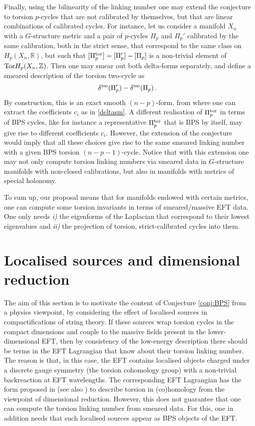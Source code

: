 \documentclass[11pt]{article}
\def\be{\begin{equation}}
\def\ee{\end{equation}}
\newcommand{\IR}{\mathbb{R}}
\newcommand{\IZ}{\mathbb{Z}}
\begin{document}
Finally, using the bilinearity of the linking number one may extend the conjecture to torsion $p$-cycles that are not calibrated by themselves, but that are linear combinations of calibrated cycles. For instance, let us consider a manifold $X_n$ with a $G$-structure metric and a pair of $p$-cycles $\Pi_p$ and $\Pi_p'$ calibrated by the same calibration, both in the strict sense, that correspond to the same class on $H_p(X_n, \IR)$, but such that $[\Pi_p^{\rm tor}] = [\Pi_p'] - [\Pi_p]$ is a non-trivial element of ${\rm Tor} H_p(X_n, \IZ)$. Then one may smear out both delta-forms separately, and define a smeared description of the torsion two-cycle as
\be
\delta^{\rm sm} (\Pi_p') - \delta^{\rm sm} (\Pi_p) \, .
\label{deldif}
\ee
By construction, this is an exact smooth $(n-p)$-form, from where one can extract the coefficients $c_i$ as in \eqref{deltasm}. A different realisation of $\Pi_p^{\rm tor}$ in terms of BPS cycles, like for instance a representative $\Pi_p^{\rm tor}$ that is BPS by itself, may give rise to different coefficients $c_i$. However, the extension of the conjecture would imply that all these choices give rise to the same smeared linking number with a given BPS torsion $(n-p-1)$-cycle. Notice that with this extension one may not only compute torsion linking numbers via smeared data in $G$-structure manifolds with non-closed calibrations, but also in manifolds with metrics of special holonomy. 

To sum up, our proposal means that for manifolds endowed with certain metrics, one can compute some torsion invariants in terms of smeared/massive EFT data. One only needs {\it i)} the eigenforms of the Laplacian that correspond to their lowest eigenvalues and {\it ii)} the projection of torsion, strict-calibrated cycles into them. 



\section{Localised sources and dimensional reduction}
\label{s:dimred}

The aim of this section is to motivate the content of Conjecture \ref{conj:BPS} from a physics viewpoint, by considering the effect of localised sources in compactifications of string theory. If these sources wrap torsion cycles in the compact dimensions and couple to the massive fields present in the lower-dimensional EFT, then by consistency of the low-energy description there should be terms in the EFT Lagrangian that know about their torsion linking number. The reason is that, in this case, the EFT contains localised objects charged under a discrete gauge symmetry (the torsion cohomology group) with a non-trivial backreaction at EFT wavelengths. The corresponding EFT Lagrangian has the form proposed in \cite{Camara:2011jg} (see also \cite{Grimm:2011tb,Berasaluce-Gonzalez:2012abm,Berasaluce-Gonzalez:2012awn,Mayrhofer:2014laa,Grimm:2015ona,Braun:2017oak}) to describe torsion in (co)homology from the viewpoint of dimensional reduction. However, this does not guarantee that one can compute the torsion linking number from smeared data. For this, one in addition needs that such localised sources appear as BPS objects of the EFT. 
\end{document}
